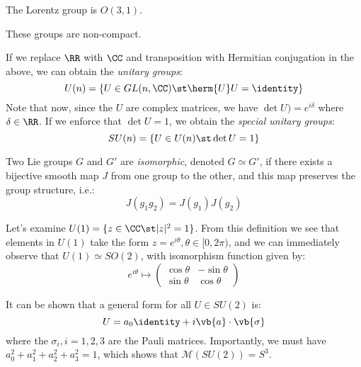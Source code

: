 \documentclass{jknotes}
\begin{document}
\begin{eg}
    The Lorentz group is \(O(3,1)\).
\end{eg}
These groups are non-compact.

If we replace \(\RR\) with \(\CC\) and transposition with Hermitian conjugation in the above, we can obtain the \emph{unitary groups}:
\begin{equation}
    U(n) = \{U\in GL(n,\CC) \st \herm{U}U = \identity\}
\end{equation}
Note that now, since the \(U\) are complex matrices, we have \(\det U) = e^{i\delta}\) where \(\delta \in \RR\). If we enforce that \(\det U = 1\), we obtain the \emph{special unitary groups}:
\begin{equation}
    SU(n) = \{U \in U(n) \st \det U = 1\}
\end{equation}

\begin{defn}
    Two Lie groups \(G\) and \(G'\) are \emph{isomorphic}, denoted \(G \simeq G'\), if there exists a bijective smooth map \(J\) from one group to the other, and this map preserves the group structure, i.e.:
    \begin{equation}
        J(g_1g_2) = J(g_1)J(g_2)
    \end{equation}
\end{defn}

\begin{eg}
    Let's examine \(U(1) = \{z \in \CC \st |z|^2 = 1\}\). From this definition we see that elements in \(U(1)\) take the form \(z = e^{i\theta}, \theta \in [0,2\pi)\), and we can immediately observe that \(U(1) \simeq SO(2)\), with isomorphism function given by:
    \begin{equation}
        e^{i\theta} \mapsto 
        \begin{pmatrix}
            \cos\theta & -\sin\theta\\
            \sin\theta & \cos\theta
        \end{pmatrix}
    \end{equation}
\end{eg}

\begin{eg}
    It can be shown that a general form for all \(U \in SU(2)\) is:
    \begin{equation}
        U = a_0\identity + i \vb{a}\cdot\vb{\sigma}
    \end{equation}
    where the \(\sigma_i, i = 1,2,3\) are the Pauli matrices. Importantly, we must have \(a_0^2 + a_1^2 + a_2^2 + a_3^2 = 1\), which shows that \(\mathcal{M}(SU(2)) = S^3\).
\end{eg}
\end{document}
